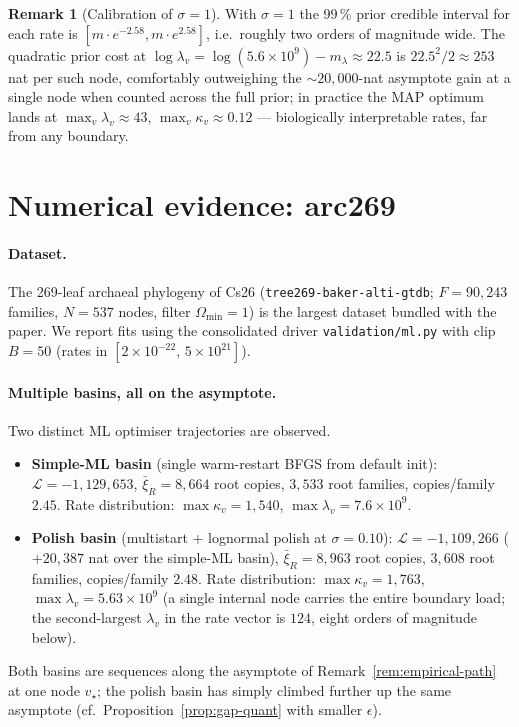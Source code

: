 \documentclass[11pt]{article}
\newcommand{\troot}{R}
\newcommand{\rate}{\kappa}             %
\newcommand{\dup}{\lambda}             %
\newcommand{\Ll}{\mathcal{L}}
\theoremstyle{definition}
\newtheorem{remark}[theorem]{Remark}
\begin{document}
\begin{remark}[Calibration of $\sigma = 1$]
With $\sigma = 1$ the 99\,\% prior credible interval for each rate
is $[m \cdot e^{-2.58}, m \cdot e^{2.58}]$, i.e.\ roughly two orders
of magnitude wide. The quadratic prior cost at
$\log\dup_v = \log(5.6\times10^9) - m_\dup \approx 22.5$ is
$22.5^2/2 \approx 253$ nat per such node, comfortably outweighing
the $\sim 20{,}000$-nat asymptote gain at a single node when
counted across the full prior; in practice the MAP optimum lands at
$\max_v\dup_v \approx 43$, $\max_v\rate_v \approx 0.12$ ---
biologically interpretable rates, far from any boundary.
\end{remark}

\section{Numerical evidence: arc269}
\label{sec:numerical}

\paragraph{Dataset.}
The 269-leaf archaeal phylogeny of Cs26 (\texttt{tree269-baker-alti-gtdb};
$F = 90{,}243$ families, $N = 537$ nodes, filter $\Omega_{\min} = 1$)
is the largest dataset bundled with the paper. We report fits using
the consolidated driver \texttt{validation/ml.py} with clip
$B = 50$ (rates in $[2\times10^{-22},\, 5\times10^{21}]$).

\paragraph{Multiple basins, all on the asymptote.}
Two distinct ML optimiser trajectories are observed.

\begin{itemize}[leftmargin=*]
\item \textbf{Simple-ML basin} (single warm-restart BFGS from default
init): $\Ll = -1{,}129{,}653$, $\bar\xi_\troot = 8{,}664$ root copies,
$3{,}533$ root families, copies/family $2.45$.  Rate distribution:
$\max\rate_v = 1{,}540$, $\max\dup_v = 7.6\times10^9$.
\item \textbf{Polish basin} (multistart + lognormal polish at
$\sigma = 0.10$): $\Ll = -1{,}109{,}266$
($+20{,}387$ nat over the simple-ML basin),
$\bar\xi_\troot = 8{,}963$ root copies,
$3{,}608$ root families, copies/family $2.48$. Rate distribution:
$\max\rate_v = 1{,}763$, $\max\dup_v = 5.63\times10^9$ (a single
internal node carries the entire boundary load; the second-largest
$\dup_v$ in the rate vector is $124$, eight orders of magnitude
below).
\end{itemize}
Both basins are sequences along the asymptote of
Remark~\ref{rem:empirical-path} at one node $v_\star$; the polish
basin has simply climbed further up the same asymptote
(cf.\ Proposition~\ref{prop:gap-quant} with smaller $\epsilon$).
\end{document}

